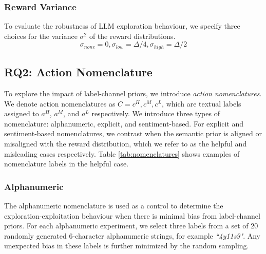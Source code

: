 \documentclass{article} %
\begin{document}
\subsubsection*{Reward Variance}
To evaluate the robustness of LLM exploration behaviour, we specify three choices for the variance $\sigma^2$ of the reward distributions. 
\[ \sigma_{none} = 0, \sigma_{low} = \Delta /4, \sigma_{high} = \Delta /2 \]


\subsection*{RQ2: Action Nomenclature}
To explore the impact of label-channel priors, we introduce \textit{action nomenclatures}. We denote action nomenclatures as $C = {c^H, c^M, c^L}$, which are textual labels assigned to $a^H$, $a^M$, and $a^L$ respectively. We introduce three types of nomenclature: alphanumeric, explicit, and sentiment-based. For explicit and sentiment-based nomenclatures, we contrast when the semantic prior is aligned or misaligned with the reward distribution, which we refer to as the helpful and misleading cases respectively. Table \ref{tab:nomenclatures} shows examples of nomenclature labels in the helpful case. 

\begin{table}[ht]
\centering
{}
\caption{Action nomenclature examples. In the misleading case, the labels for $c^H$ and $c^L$ are swapped. Note that the labels for sentiment and alphanumeric are examples - we randomly sample these labels from a set at the start of each run to reduce the bias from a single label.}
\label{tab:nomenclatures}
\end{table}

\subsubsection*{Alphanumeric}
The alphanumeric nomenclature is used as a control to determine the exploration-exploitation behaviour when there is minimal bias from label-channel priors. For each alphanumeric experiment, we select three labels from a set of 20 randomly generated 6-character alphanumeric strings, for example 
\textit{``4y11s9"}. Any unexpected bias in these labels is further minimized by the random sampling.
\end{document}
